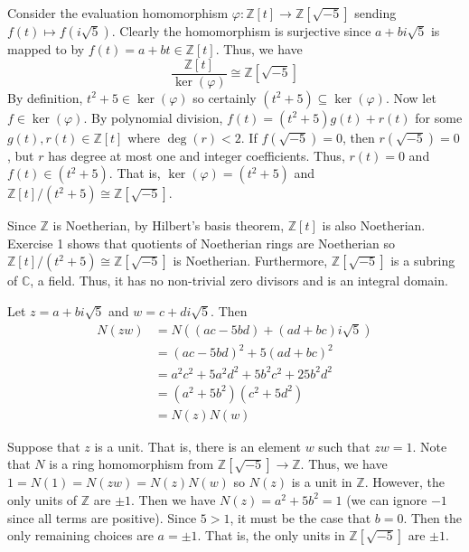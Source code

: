 \documentclass[../../master.tex]{subfiles}
\begin{document}
    \begin{solution}
        Consider the evaluation homomorphism $\varphi : \mathbb{Z}[t] \to
        \mathbb{Z}[\sqrt{-5}]$ sending $f(t) \mapsto f(i \sqrt{5})$. Clearly the
        homomorphism is surjective since $a + bi \sqrt{5}$ is mapped to by $f(t)
        = a + bt \in \mathbb{Z}[t]$. Thus, we have
        \[
            \frac{\mathbb{Z}[t]}{\ker(\varphi)} \cong \mathbb{Z}[\sqrt{-5}]
        \] 
        By definition, $t^2 + 5 \in \ker(\varphi)$ so certainly $(t^2 + 5)
        \subseteq \ker(\varphi)$. Now let $f \in \ker(\varphi)$. By polynomial
        division, $f(t) = (t^2 + 5) g(t) + r(t)$ for some $g(t), r(t) \in
        \mathbb{Z}[t]$ where $\deg(r) < 2$. If $f(\sqrt{-5}) = 0$, then
        $r(\sqrt{-5}) = 0$, but $r$ has degree at most one and integer
        coefficients. Thus, $r(t) = 0$ and $f(t) \in (t^2 + 5)$. That is,
        $\ker(\varphi) = (t^2 + 5)$ and $\mathbb{Z}[t] / (t^2 + 5) \cong
        \mathbb{Z}[\sqrt{-5}]$.

        Since $\mathbb{Z}$ is Noetherian, by Hilbert's basis theorem,
        $\mathbb{Z}[t]$ is also Noetherian. Exercise 1 shows that quotients of
        Noetherian rings are Noetherian so $\mathbb{Z}[t] / (t^2+5) \cong
        \mathbb{Z}[\sqrt{-5}]$ is Noetherian. Furthermore,
        $\mathbb{Z}[\sqrt{-5}]$ is a subring of $\mathbb{C}$, a field. Thus, it
        has no non-trivial zero divisors and is an integral domain.

        Let $z = a + bi \sqrt{5}$ and $w = c + di \sqrt{5}$. Then
        \begin{align*}
            N(zw) &= N((ac - 5bd) + (ad + bc)i \sqrt{5}) \\
                  &= (ac - 5bd)^2 + 5(ad + bc)^2 \\
                  &= a^2 c^2 + 5a^2 d^2 + 5 b^2 c^2 + 25b^2 d^2 \\
                  &= (a^2 + 5b^2) (c^2 + 5d^2) \\
                  &= N(z) N(w)
        \end{align*}

        Suppose that $z$ is a unit. That is, there is an element $w$ such that
        $zw = 1$. Note that $N$ is a ring homomorphism from
        $\mathbb{Z}[\sqrt{-5}] \to \mathbb{Z}$. Thus, we have $1 = N(1) = N(zw)
        = N(z) N(w)$ so $N(z)$ is a unit in $\mathbb{Z}$. However, the only
        units of $\mathbb{Z}$ are $\pm 1$. Then we have  $N(z) = a^2 + 5b^2 =
        1$ (we can ignore $-1$ since all terms are positive). Since $5 > 1$, it
        must be the case that $b = 0$. Then the only remaining choices are $a =
        \pm 1$. That is, the only units in $\mathbb{Z}[\sqrt{-5}]$ are $\pm 1$.


\end{solution}
\end{document}
